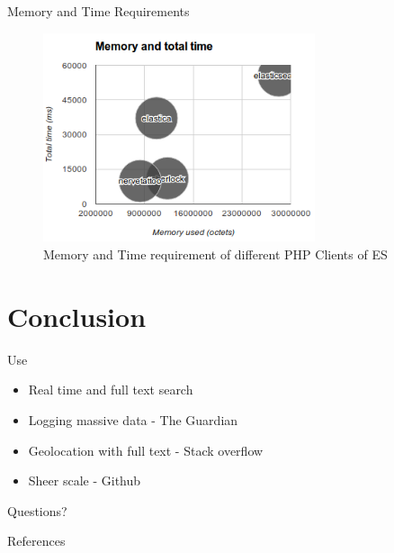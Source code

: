 \documentclass[10pt]{beamer}
\begin{document}
\begin{frame}{Memory and Time Requirements}
	\begin{figure}
		\centering\includegraphics[width=8cm]{clients_memory}
		\caption{Memory and Time requirement of different PHP Clients of ES}
	\end{figure}
\end{frame}

\section{Conclusion}
\begin{frame}{Use}
	\begin{itemize}
		\item Real time and full text search
		\item Logging massive data - The Guardian
		\item Geolocation with full text - Stack overflow
		\item Sheer scale - Github
	\end{itemize}
\end{frame}

\begin{frame}[standout]
  Questions?
\end{frame}

\begin{frame}[allowframebreaks]{References}

  
  

\end{frame}
\end{document}
